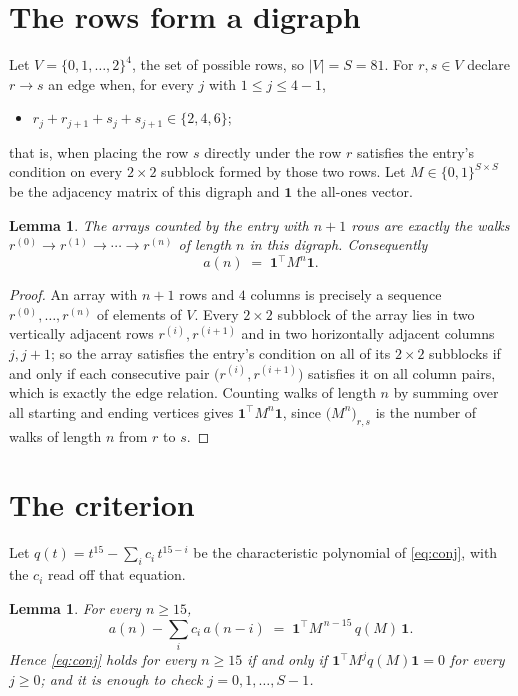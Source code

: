 \documentclass[11pt,a4paper]{article}
\theoremstyle{plain}
\newtheorem{lemma}[theorem]{Lemma}
\theoremstyle{definition}
\begin{document}
\section{The rows form a digraph}

Let $V=\{0,1,\dots,2\}^{4}$, the set of possible rows, so $|V|=S=81$. For
$r,s\in V$ declare $r\to s$ an edge when, for every $j$ with $1\le j\le 4-1$,
\begin{itemize}
\item $r_j+r_{j+1}+s_j+s_{j+1}\in\{2, 4, 6\}$;

\end{itemize}
that is, when placing the row $s$ directly under the row $r$ satisfies the entry's
condition on every $2\times2$ subblock formed by those two rows. Let $M\in\{0,1\}^{S\times
S}$ be the adjacency matrix of this digraph and $\mathbf{1}$ the all-ones vector.

\begin{lemma}\label{lem:walk}
The arrays counted by the entry with $n+1$ rows are exactly the walks
$r^{(0)}\to r^{(1)}\to\cdots\to r^{(n)}$ of length $n$ in this digraph. Consequently
\[
a(n)\;=\;\mathbf{1}^{\!\top}M^{n}\mathbf{1} .
\]
\end{lemma}

\begin{proof}
An array with $n+1$ rows and $4$ columns is precisely a sequence
$r^{(0)},\dots,r^{(n)}$ of elements of $V$. Every $2\times2$ subblock of the array lies
in two vertically adjacent rows $r^{(i)},r^{(i+1)}$ and in two horizontally adjacent
columns $j,j+1$; so the array satisfies the entry's condition on all of its $2\times2$
subblocks if and only if each consecutive pair $\bigl(r^{(i)},r^{(i+1)}\bigr)$ satisfies
it on all column pairs, which is exactly the edge relation. Counting walks of length $n$ by
summing over all starting and ending vertices gives
$\mathbf{1}^{\!\top}M^{n}\mathbf{1}$, since
$\bigl(M^{n}\bigr)_{r,s}$ is the number of walks of length $n$ from $r$ to $s$.
\end{proof}

\section{The criterion}

Let $q(t)=t^{15}-\sum_{i}c_i\,t^{15-i}$ be the characteristic polynomial of
\eqref{eq:conj}, with the $c_i$ read off that equation.

\begin{lemma}\label{lem:crit}
For every $n\ge15$,
\[
a(n)-\sum_i c_i\,a(n-i)\;=\;\mathbf{1}^{\!\top}M^{\,n-15}\,q(M)\,\mathbf{1} .
\]
Hence \eqref{eq:conj} holds for every $n\ge15$ if and only if
$\mathbf{1}^{\!\top}M^{j}q(M)\mathbf{1}=0$ for every $j\ge0$; and it is enough to
check $j=0,1,\dots,S-1$.
\end{lemma}
\end{document}
